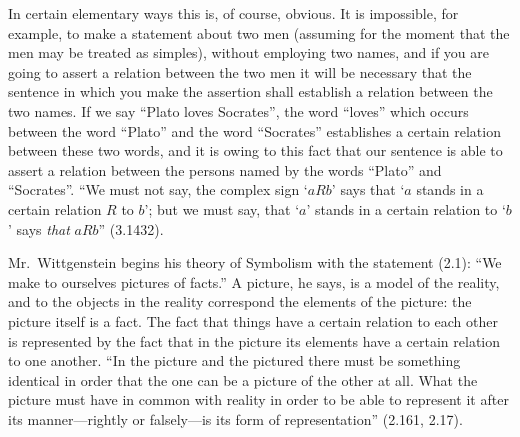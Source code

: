 In certain elementary ways this is, of course, obvious. It is impossible, for example, to make a statement about two men (assuming for the moment that the men may be treated as simples), without employing two names, and if you are going to assert a relation between the two men it will be necessary that the sentence in which you make the assertion shall establish a relation between the two names. If we say “Plato loves Socrates”, the word “loves” which occurs between the word “Plato” and the word “Socrates” establishes a certain relation between these two words, and it is owing to this fact that our sentence is able to assert a relation between the persons named by the words “Plato” and “Socrates”. “We must not say, the complex sign ‘$aRb$’ says that ‘$a$ stands in a certain relation $R$ to $b$’; but we must say, that ‘$a$’ stands in a certain relation to ‘$b$’ says \emph{that} $aRb$” (3.1432).

Mr.\ Wittgenstein begins his theory of Symbolism with the statement (2.1): “We make to ourselves pictures of facts.” A picture, he says, is a model of the reality, and to the objects in the reality correspond the elements of the picture: the picture itself is a fact. The fact that things have a certain relation to each other is represented by the fact that in the picture its elements have a certain relation to one another. “In the picture and the pictured there must be something identical in order that the one can be a picture of the other at all. What the picture must have in common with reality in order to be able to represent it after its manner—rightly or falsely—is its form of representation” (2.161, 2.17).

